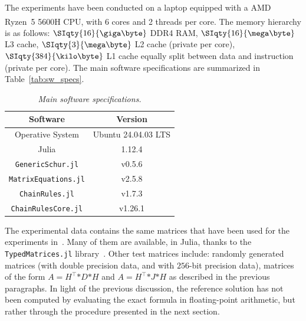 The experiments have been conducted on a laptop equipped with a \textsc{AMD} Ryzen\textsuperscript{\texttrademark}~5 5600H CPU, with 6 cores and 2 threads per core. The memory hierarchy is as follows: $\SIqty{16}{\giga\byte}$ DDR4 RAM, $\SIqty{16}{\mega\byte}$ L3 cache, $\SIqty{3}{\mega\byte}$ L2 cache (private per core), $\SIqty{384}{\kilo\byte}$ L1 cache equally split between data and instruction (private per core). 
The main software specifications are summarized in Table~\vref{tab:sw_specs}. 
\begin{table}[htp]
	\centering
	\caption{\emph{Main software specifications.}}
	\label{tab:sw_specs}
	\begin{tabular}{cc}
		\toprule
		\textbf{Software} & \textbf{Version}\\
		\midrule
		Operative System & Ubuntu 24.04.03 \textsc{LTS}\\
		Julia & 1.12.4\\
		\texttt{GenericSchur.jl} & v0.5.6\\
		\texttt{MatrixEquations.jl} & v2.5.8\\
		\texttt{ChainRules.jl} & v1.7.3\\
		\texttt{ChainRulesCore.jl} & v1.26.1\\
		\bottomrule
	\end{tabular}
\end{table}

The experimental data contains the same matrices that have been used for the experiments in~\cite{higham:hf19_mpexpm}. Many of them are available, in Julia, thanks to the \texttt{TypedMatrices.jl} library~\cite{fasi25:TypedMatrices}. 
Other test matrices include: randomly generated matrices (with double precision data, and with $256$-bit precision data), matrices of the form $A = H^{\top}\!\mathtt{*}D\mathtt{*}H$ and $A = H^{\top}\!\mathtt{*}J\mathtt{*}H$ as described in the previous paragraphs. In light of the previous discussion, the reference solution has not been computed by evaluating the exact formula in floating-point arithmetic, but rather through the procedure presented in the next section.

